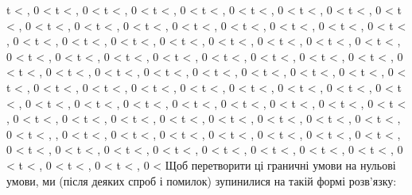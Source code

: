 \documentclass[
  ukrainian,
]{article}
\begin{document}
t \textless{} \infty , 0 \textless{} t \textless{} \infty , 0
\textless{} t \textless{} \infty , 0 \textless{} t \textless{} \infty ,
0 \textless{} t \textless{} \infty , 0 \textless{} t \textless{}
\infty , 0 \textless{} t \textless{} \infty , 0 \textless{} t
\textless{} \infty , 0 \textless{} t \textless{} \infty , 0 \textless{}
t \textless{} \infty , 0 \textless{} t \textless{} \infty , 0
\textless{} t \textless{} \infty , 0 \textless{} t \textless{} \infty ,
0 \textless{} t \textless{} \infty , 0 \textless{} t \textless{}
\infty , 0 \textless{} t \textless{} \infty , 0 \textless{} t
\textless{} \infty , 0 \textless{} t \textless{} \infty , 0 \textless{}
t \textless{} \infty , 0 \textless{} t \textless{} \infty , 0
\textless{} t \textless{} \infty , 0 \textless{} t \textless{} \infty ,
0 \textless{} t \textless{} \infty , 0 \textless{} t \textless{}
\infty , 0 \textless{} t \textless{} \infty , 0 \textless{} t
\textless{} \infty , 0 \textless{} t \textless{} \infty , 0 \textless{}
t \textless{} \infty , 0 \textless{} t \textless{} \infty , 0
\textless{} t \textless{} \infty , 0 \textless{} t \textless{} \infty ,
0 \textless{} t \textless{} \infty , 0 \textless{} t \textless{}
\infty , 0 \textless{} t \textless{} \infty , 0 \textless{} t
\textless{} \infty , 0 \textless{} t \textless{} \infty , 0 \textless{}
t \textless{} \infty , 0 \textless{} t \textless{} \infty , 0
\textless{} t \textless{} \infty , 0 \textless{} t \textless{} \infty ,
0 \textless{} t \textless{} \infty , 0 \textless{} t \textless{}
\infty , 0 \textless{} t \textless{} \infty , 0 \textless{} t
\textless{} \infty , 0 \textless{} t \textless{} \infty , 0 \textless{}
t \textless{} \infty , 0 \textless{} t \textless{} \infty , 0
\textless{} t \textless{} \infty , 0 \textless{} t \textless{} \infty ,
0 \textless{} t \textless{} \infty , 0 \textless{} t \textless{}
\infty , 0 \textless{} t \textless{} \infty , 0 \textless{} t
\textless{} \infty , 0 \textless{} t \textless{} \infty , 0 \textless{}
t \textless{} \infty , 0 \textless{} t \textless{} \infty , 0
\textless{} t \textless{} \infty , 0 \textless{} t \textless{} \infty ,
0 \textless{} t \textless{} \infty , 0 \textless{} t \textless{}
\infty , 0 \textless{} t \textless{} \infty , 0 \textless{} t
\textless{} \infty , 0 \textless{} t \textless{} \infty , 0 \textless{}
t \textless{} \infty , 0 \textless{} t \textless{} \infty , 0
\textless{} t \textless{} \infty , 0 \textless{} t \textless{} \infty ,
, 0 \textless{} t \textless{} \infty , 0 \textless{} t \textless{}
\infty , 0 \textless{} t \textless{} \infty , 0 \textless{} t
\textless{} \infty , 0 \textless{} t \textless{} \infty , 0 \textless{}
t \textless{} \infty , 0 \textless{} t \textless{} \infty , 0
\textless{} t \textless{} \infty , 0 \textless{} t \textless{} \infty ,
0 \textless{} t \textless{} \infty , 0 \textless{} t \textless{}
\infty , 0 \textless{} t \textless{} \infty , 0 \textless{} t
\textless{} \infty , 0 \textless{} t \textless{} \infty , 0 \textless{}
t \textless{} \infty , 0 \textless{} t \textless{} \infty , 0
\textless{} t \textless{} \infty , 0 \textless{} t \textless{} \infty ,
0 \textless{} Щоб перетворити ці граничні умови на нульові умови, ми
(після деяких спроб і помилок) зупинилися на такій формі розв'язку:
\end{document}
